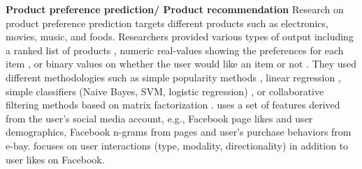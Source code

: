 \documentclass[11pt,a4paper]{article}
\begin{document}
\textbf{Product preference prediction/ Product recommendation}
Research on product preference prediction targets different products such as electronics, movies, music, and foods. Researchers provided various types of output including a ranked list of products \cite{zhangPenn, zhangPenn2}, numeric real-values showing the preferences for each item \cite{sedhain}, or binary values on whether the user would like an item or not \cite{suvash}. They used different methodologies such as simple popularity methods \cite{zhangPenn}, linear regression \cite{zhangPenn, zhangPenn2, suvash}, simple classifiers (Naive Bayes, SVM, logistic regression) \cite{zhangPenn, suvash}, or collaborative filtering methods based on matrix factorization \cite{sedhain}. \citet{zhangPenn, zhangPenn2} uses a set of features derived from the user’s social media account, e.g., Facebook page likes and user demographics, Facebook n-grams from pages and user's purchase behaviors from e-bay. \citet{suvash} focuses on user interactions (type, modality, directionality) in addition to user likes on Facebook.


\end{document}

